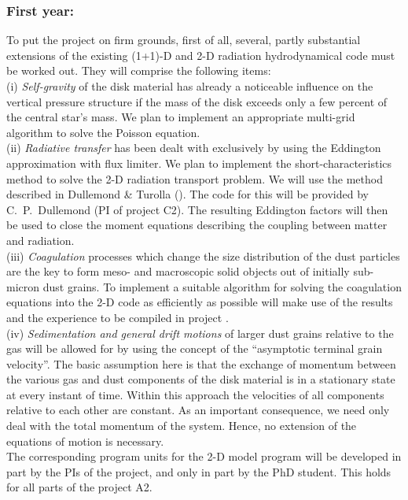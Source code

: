 \subsubsection{First year:}
To put the project on firm grounds, first of all, several, partly
substantial extensions of the existing (1+1)-D and 2-D radiation
hydrodynamical code must be worked
out. They will comprise the following items:\\
%
(i) \emph{Self-gravity} of the disk material has already a
noticeable influence on the vertical pressure structure if the mass of the
disk exceeds only a few percent of the central star's mass. We
plan to implement an appropriate multi-grid algorithm to solve the
Poisson equation.\\
%
(ii) \emph{Radiative transfer} has been dealt with exclusively by using the
Eddington approximation with flux limiter. We plan to implement the
short-characteristics method to solve the 2-D radiation transport
problem. We will use the method described in Dullemond \& Turolla
(). The code for this will be provided by C.\ P.\ Dullemond (PI of
project C2). The resulting Eddington factors will then be used to close the
moment equations describing the coupling between matter and radiation.\\
%
(iii) \emph{Coagulation} processes which change the size
distribution of the dust particles are the key to form meso- and
macroscopic solid objects out of initially sub-micron dust grains.
To implement a suitable algorithm for solving the coagulation
equations into the 2-D code as efficiently as possible will make
use of the results and the experience to be compiled in project
\projdul.\\
%
(iv) \emph{Sedimentation and general drift motions} of larger dust
grains relative to the gas will be allowed for by using the
concept of the ``asymptotic terminal grain velocity''. The basic
assumption here is that the exchange of momentum between the
various gas and dust components of the disk material is in a
stationary state at every instant of time. Within this approach
the velocities of all components relative to each other are
constant. As an important consequence, we need only deal with the
total momentum of the system. Hence, no extension of the equations
of motion is necessary.
\\
%
The corresponding program units for the 2-D model program will be
developed in part by the PIs of the project, and only in part by the
PhD student. This holds for all parts of the project A2.

